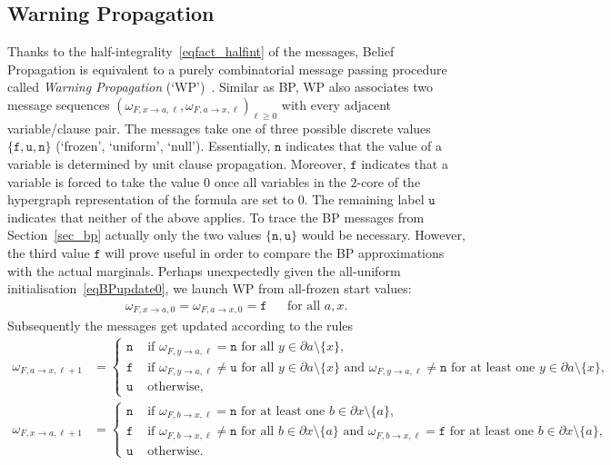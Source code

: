 \documentclass[10pt,reqno]{amsart}
\numberwithin{equation}{section}
\newcommand{\frozen}{\mathtt{f}}
\newcommand{\unfrozen}{\mathtt{u}}
\newcommand{\nll}{\mathtt{n}}
\newcommand{\fzn}{\frozen}
\newcommand{\uzn}{\unfrozen}
\newcommand\Sec{Section}
\begin{document}
\subsection{Warning Propagation}\label{sec_wp}
Thanks to the half-integrality~\eqref{eqfact_halfint} of the messages, Belief Propagation is equivalent to a purely combinatorial message passing procedure called {\em Warning Propagation} (`WP')~\cite{MM}.
Similar as BP, WP also associates two message sequences $(\omega_{F,x\to a,\ell},\omega_{F,a\to x,\ell})_{\ell\geq0}$ with every adjacent variable/clause pair.
The messages take one of three possible discrete values $\{\fzn,\uzn,\nll\}$ (`frozen', `uniform', `null').
Essentially, $\nll$ indicates that the value of a variable is determined by unit clause propagation.
Moreover, $\fzn$ indicates that a variable is forced to take the value $0$ once all variables in the $2$-core of the hypergraph representation of the formula are set to $0$.
The remaining label $\uzn$ indicates that neither of the above applies.
To trace the BP messages from \Sec~\ref{sec_bp} actually only the two values $\{\nll,\uzn\}$ would be necessary.
However, the third value $\fzn$ will prove useful in order to compare the BP approximations with the actual marginals.
Perhaps unexpectedly given the all-uniform initialisation~\eqref{eqBPupdate0}, we launch WP from all-frozen start values:
\begin{align}\label{eqWPupdate0}
	\omega_{F,x\to a,0}=\omega_{F,a\to x,0}=\fzn&&\mbox{for all }a,x.
\end{align}
Subsequently the messages get updated according to the rules
\begin{align}\label{eqWP1}
	\omega_{F,a\to x,\ell+1}&=\begin{cases}
		\nll&\mbox{ if }\omega_{F,y\to a,\ell}=\nll\mbox{ for all }y\in\partial a\setminus\{x\},\\
		\fzn&\mbox{ if }\omega_{F,y\to a,\ell}\neq\uzn\mbox{ for all }y\in\partial a\setminus\{x\}
		\mbox{ and }\omega_{F,y\to a,\ell}\neq\nll\mbox{ for at least one }y\in\partial a\setminus\{x\},\\
		\uzn&\mbox{ otherwise},
		\end{cases}\\
	\omega_{F,x\to a,\ell+1}&=\begin{cases}
		\nll&\mbox{ if }\omega_{F,b\to x,\ell}=\nll\mbox{ for at least one }b\in\partial x\setminus\{a\},\\
		\fzn&\mbox{ if }\omega_{F,b\to x,\ell}\neq\nll\mbox{ for all }b\in\partial x\setminus\{a\}
		\mbox{ and }\omega_{F,b\to x,\ell}=\fzn\mbox{ for at least one }b\in\partial x\setminus\{a\},\\
		\uzn&\mbox{ otherwise}.
		\end{cases}\label{eqWP2}
\end{align}
\end{document}
